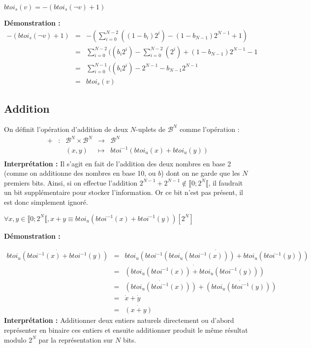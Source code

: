 \documentclass[../../main.tex]{subfiles}
\begin{document}
\proposition{} $btoi_{s}(v) = -(btoi_{s}(\neg{v}) + 1)$

\textbf{Démonstration :}
\[
\begin{array}{lcl}
-(btoi_{s}(\neg{v}) + 1) & = & -(\displaystyle\sum_{i = 0}^{N-2}((1-b_{i})2^{i}) - (1-b_{N-1})2^{N-1} + 1) \\
& = & \displaystyle\sum_{i = 0}^{N-2}((b_{i}2^{i}) - \displaystyle\sum_{i = 0}^{N-2}(2^{i}) + (1 - b_{N-1})2^{N-1} - 1 \\
& = & \displaystyle\sum_{i = 0}^{N-1}((b_{i}2^{i}) - 2^{N-1} - b_{N-1}2^{N-1} \\
& = & btoi_{s}(v)
\end{array}
\]
\subsection{Addition}
On définit l'opération d'addition de deux $N$-uplets de $\mathcal{B}^{N}$ comme l'opération :
$$
\begin{array}{lclcl}
+ & : & \mathcal{B}^{N}\times{\mathcal{B}^{N}} & \rightarrow & \mathcal{B}^{N} \\
  &   & (x, y) & \mapsto & btoi^{-1}(btoi_{u}(x) + btoi_{u}(y)) \\
\end{array}
$$
\textbf{Interprétation :} Il s'agit en fait de l'addition des deux nombres en base 2 (comme on additionne des nombres en base 10, ou $b$) dont on ne garde que les $N$ premiers bits. Ainsi, si on effectue l'addition $2^{N-1} + 2^{N-1}\notin{\llbracket 0; 2^{N}\llbracket}$, il faudrait un bit supplémentaire pour stocker l'information. Or ce bit n'est pas présent, il est donc simplement ignoré.

 $\forall{x, y\in{\llbracket 0; 2^{N}\llbracket}}, x + y \equiv btoi_{u}(btoi^{-1}(x) + btoi^{-1}(y)) [2^{N}]$

\textbf{Démonstration :}

\[
\begin{array}{lcl}
\dot{btoi_{u}(btoi^{-1}(x) + btoi^{-1}(y))} & = & \dot{btoi_{u}(btoi^{-1}(btoi_{u}(btoi^{-1}(x))) + btoi_{u}(btoi^{-1}(y)))} \\
 & = & \dot{(btoi_{u}(btoi^{-1}(x)) + btoi_{u}(btoi^{-1}(y)))} \\
 & = & \dot{(btoi_{u}(btoi^{-1}(x)))} + \dot{(btoi_{u}(btoi^{-1}(y)))} \\
 & = & \dot{x} + \dot{y} \\
 & = & \dot{(x + y)}
\end{array}
\]
\textbf{Interprétation :} Additionner deux entiers naturels directement ou d'abord représenter en binaire ces entiers et ensuite additionner produit le même résultat modulo $2^{N}$ par la représentation sur $N$ bits.
\end{document}
